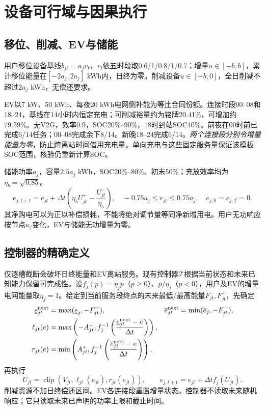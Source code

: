 \documentclass[UTF8,a4paper,11pt]{ctexart}
\newcommand{\Tcal}{\mathcal T}\newcommand{\ind}{\mathbf 1}
\begin{document}
\section{设备可行域与因果执行}
\subsection{移位、削减、EV与储能}
用户移位设备基线$b_{jt}=a_jv_t$，$v_t$依五时段取0.6/1/0.8/1/0.7；增量$u\in[-b,b]$，累计移位能量在$[-2a_j,2a_j]$ kWh内，日终为零。削减设备$u\in[-b,0]$，全日削减不超过$2a_j$ kWh，无偿还要求。

EV以7 kW、50 kWh、每夜20 kWh电网侧补能为等比合同份额。连接时段00--08和18--24，基线在14小时内恒定充电；可削减裕量约为铭牌20.41\%，可增加约79.59\%。无V2G，效率0.9，SOC20\%--90\%，18时到站SOC40\%。前夜在00时前已完成6/14任务；00--08完成余下8/14。新晚18--24完成6/14。\emph{两个连接段分别令增量能量为零}，防止跨离站时间借用充电量。单向充电与这些固定服务量保证该模板SOC范围，核验仍重新计算SOC。

储能功率$a_j$，容量$2.5a_j$ kWh，SOC20\%--80\%、初末50\%；充放效率均为$\eta_b=\sqrt{0.85}$。
\begin{equation}
 e_{j,t+1}=e_{jt}+\Delta t\left(\eta_bU_{jt}^{+}-\frac{U_{jt}^{-}}{\eta_b}\right),
 \quad -0.75a_j\leq e_{jt}\leq0.75a_j,\quad e_{j,0}=e_{j,T}=0.
\end{equation}
其净购电可以为正以补偿损耗，不能将绝对调节量等同净新增用电。用户无功响应按节点$\kappa_j$变化，EV与储能无功增量为零。

\subsection{控制器的精确定义}
仅逐槽截断会破坏日终能量和EV离站服务。现有控制器$\Tcal$根据当前状态和未来已知能力保留可完成性。设$f_j(p)=\eta_jp$（$p\geq0$）、$p/\eta_j$（$p<0$），用户及EV的增量电网能量取$\eta_j=1$。给定到当前服务段终点的未来最低/最高能量$F^-_{jt},F^+_{jt}$，先确定
\begin{align}
 \underline e^{\rm next}_{jt}&=\max(\underline e_j,-F^+_{jt}),&
 \overline e^{\rm next}_{jt}&=\min(\overline e_j,-F^-_{jt}),\\
 \ell_{jt}(e)&=\max\left(-A^-_{jt},f_j^{-1}\left(\frac{\underline e^{\rm next}_{jt}-e}{\Delta t}\right)\right),\\
 r_{jt}(e)&=\min\left(A^+_{jt},f_j^{-1}\left(\frac{\overline e^{\rm next}_{jt}-e}{\Delta t}\right)\right).
\end{align}
再执行
\begin{equation}
 U_{jt}=\operatorname{clip}(V_{jt},\ell_{jt}(e_{jt}),r_{jt}(e_{jt})),\qquad
 e_{j,t+1}=e_{jt}+\Delta t f_j(U_{jt}).\label{eq:controller}
\end{equation}
削减资源不加日终偿还区间。EV各连接段重置增量状态。控制器不读取未来随机响应；它只读取未来已声明的功率上限和截止时间。
\end{document}
